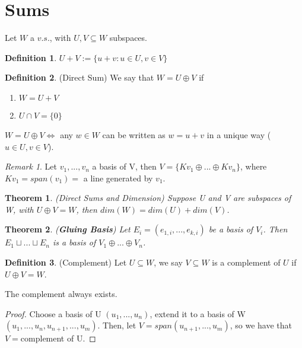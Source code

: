 \documentclass[12pt]{article}
\newtheorem{theorem}{Theorem}[section]
\theoremstyle{definition}
\newtheorem{definition}{Definition}[section]
\theoremstyle{remark}
\newtheorem*{remark}{Remark}
\begin{document}
\section{Sums}
    Let $W$ a $v.s.$, with $U,V\subseteq W$ subspaces.
    \begin{definition}
       $U+V:=\{u+v:u\in U, v\in V\} $
    \end{definition}
    \begin{definition}(Direct Sum)
        We say that $W=U\oplus V$ if
        \begin{enumerate}
            \item $W=U+V$
            \item $U\cap V =\{0\}$
        \end{enumerate}
    \end{definition}
    \begin{proposition}
        $W=U\oplus V \iff$ any $w \in W$ can be written as $w=u+v$ in a unique way ($u\in U, v\in V$).
    \end{proposition}
    \begin{remark}
        Let $v_1,...,v_n$ a basis of V, then $V=\{Kv_1\oplus...\oplus Kv_n\}$, where $Kv_1= span(v_1)=$ a line generated by $v_1$.
    \end{remark}
    \begin{theorem}(Direct Sums and Dimension)
        Suppose U and V are subspaces of W, with $U\oplus V=W$, then $dim(W)=dim(U)+dim(V)$.
    \end{theorem}
    \begin{theorem}(\textbf{Gluing Basis})
        Let $E_i=(e_{1,i},...,e_{k,i})$ be a basis of $V_i$. Then $E_1\sqcup...\sqcup E_n$ is a 
        basis of $V_1\oplus...\oplus V_n$.
        
    \end{theorem}
    \begin{definition}(Complement)
        Let $U \subseteq W$, we say $V\subseteq W$ is a complement of $U$ if $U\oplus V = W$.
    \end{definition}
    \begin{proposition}
        The complement always exists.
        \begin{proof}
            Choose a basis of U $(u_1,...,u_n)$, extend it to a basis of W $(u_1,...,u_n, u_{n+1}, ...,u_m)$. 
            Then, let $V=span(u_{n+1}, ...,u_m)$, so we have that $V=$complement of U.
        \end{proof}
    \end{proposition}
\end{document}
